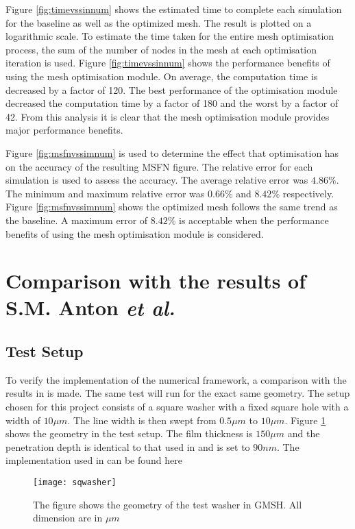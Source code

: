 Figure \ref{fig:timevssinnum} shows the estimated time to complete each simulation for the baseline as well as the optimized mesh. The result is plotted on a logarithmic scale. To estimate the time taken for the entire mesh optimisation process, the sum of the number of nodes in the mesh at each optimisation iteration is used. Figure \ref{fig:timevssinnum} shows the performance benefits of using the mesh optimisation module. On average, the computation time is decreased by a factor of 120. The best performance of the optimisation module decreased the computation time by a factor of 180 and the worst by a factor of 42. From this analysis it is clear that the mesh optimisation module provides major performance benefits. \par
Figure \ref{fig:msfnvssimnum} is used to determine the effect that optimisation has on the accuracy of the resulting MSFN figure. The relative error for each simulation is used to assess the accuracy. The average relative error was $4.86\%$. The minimum and maximum relative error was $0.66\%$ and $8.42\%$ respectively. Figure \ref{fig:msfnvssimnum} shows the optimized mesh follows the same trend as the baseline. A maximum error of $8.42\%$ is acceptable when the performance benefits of using the mesh optimisation module is considered.

\section{Comparison with the results of S.M. Anton \textit{et al.}}
\subsection{Test Setup}
To verify the implementation of the numerical framework, a comparison with the results in \cite{fluxNoiseSquidsStevenAnton} is made. The same test will run for the exact same geometry. The setup chosen for this project consists of a square washer with a fixed square hole with a width of $10 \mu m$. The line width is then swept from $0.5 \mu m$ to $10 \mu m$. Figure \ref{fig:sqwasher} shows the geometry in the test setup. The film thickness is $150 \mu m$ and the penetration depth is identical to that used in \cite{fluxNoiseSquidsStevenAnton} and is set to $90 nm$. The implementation used in \cite{fluxNoiseSquidsStevenAnton} can be found here \cite{msfnCode} 

\begin{figure}[H]
    \centering
    \texttt{[image: sqwasher]}
    \caption{The figure shows the geometry of the test washer in GMSH. All dimension are in $\mu m$}
    \label{fig:sqwasher}
\end{figure}

